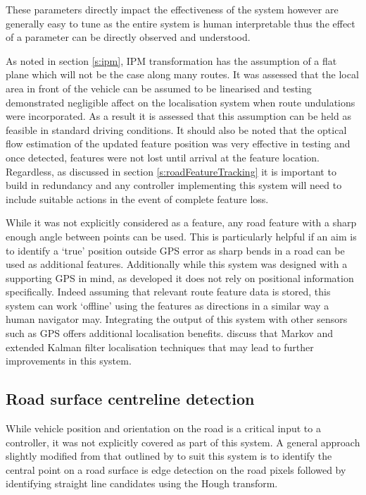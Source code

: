 \documentclass[]{aiaa-tc}%
\begin{document}
These parameters directly impact the effectiveness of the system however are generally easy to tune as the entire system is human interpretable thus the effect of a parameter can be directly observed and understood.

As noted in section \ref{s:ipm}, IPM transformation has the assumption of a flat plane which will not be the case along many routes. It was assessed that the local area in front of the vehicle can be assumed to be linearised and testing demonstrated negligible affect on the localisation system when route undulations were incorporated. As a result it is assessed that this assumption can be held as feasible in standard driving conditions. It should also be noted that the optical flow estimation of the updated feature position was very effective in testing and once detected, features were not lost until arrival at the feature location. Regardless, as discussed in section \ref{s:roadFeatureTracking} it is important to build in redundancy and any controller implementing this system will need to include suitable actions in the event of complete feature loss.

While it was not explicitly considered as a feature, any road feature with a sharp enough angle between points can be used. This is particularly helpful if an aim is to identify a `true' position outside GPS error as sharp bends in a road can be used as additional features. Additionally while this system was designed with a supporting GPS in mind, as developed it does not rely on positional information specifically. Indeed assuming that relevant route feature data is stored, this system can work `offline' using the features as directions in a similar way a human navigator may. Integrating the output of this system with other sensors such as GPS offers additional localisation benefits. \citet{probabalisticRobotics} discuss that Markov and extended Kalman filter localisation techniques that may lead to further improvements in this system.



\subsection{Road surface centreline detection}

While vehicle position and orientation on the road is a critical input to a controller, it was not explicitly covered as part of this system. A general approach slightly modified from that outlined by \citet{canneyAndHoughLanes} to suit this system is to identify the central point on a road surface is edge detection on the road pixels followed by identifying straight line candidates using the Hough transform.  
\end{document}
